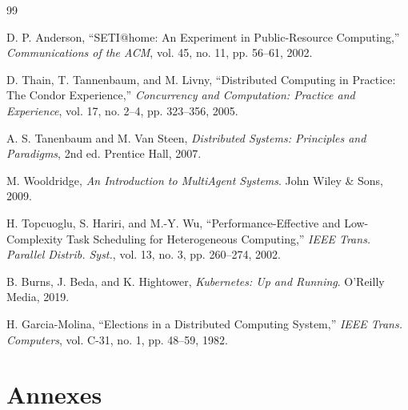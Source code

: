 \documentclass[12pt,a4paper]{report}
\begin{document}
\begin{thebibliography}{99}

D. P. Anderson, ``SETI@home: An Experiment in Public-Resource Computing,''
\textit{Communications of the ACM}, vol. 45, no. 11, pp. 56--61, 2002.

D. Thain, T. Tannenbaum, and M. Livny,
``Distributed Computing in Practice: The Condor Experience,''
\textit{Concurrency and Computation: Practice and Experience}, vol. 17, no. 2--4, pp. 323--356, 2005.

A. S. Tanenbaum and M. Van Steen,
\textit{Distributed Systems: Principles and Paradigms}, 2nd ed. Prentice Hall, 2007.

M. Wooldridge,
\textit{An Introduction to MultiAgent Systems}. John Wiley \& Sons, 2009.

H. Topcuoglu, S. Hariri, and M.-Y. Wu,
``Performance-Effective and Low-Complexity Task Scheduling for Heterogeneous Computing,''
\textit{IEEE Trans. Parallel Distrib. Syst.}, vol. 13, no. 3, pp. 260--274, 2002.

B. Burns, J. Beda, and K. Hightower,
\textit{Kubernetes: Up and Running}. O'Reilly Media, 2019.

H. Garcia-Molina,
``Elections in a Distributed Computing System,''
\textit{IEEE Trans. Computers}, vol. C-31, no. 1, pp. 48--59, 1982.

\end{thebibliography}

\section*{Annexes}
\end{document}
